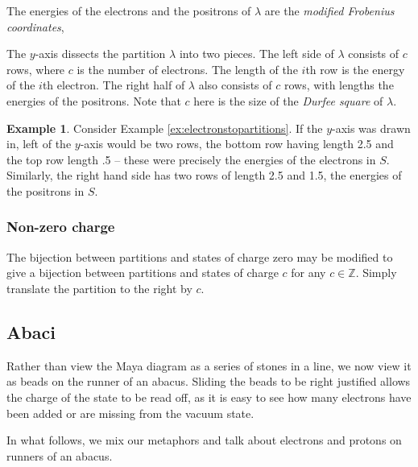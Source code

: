 \documentclass{amsart}[12pt]
\theoremstyle{definition}
\newtheorem{example}[dummy]{Example}
\newcommand{\Z}{\mathbb{Z}}
\begin{document}
The energies of the electrons and the positrons of $\lambda$ are
the \emph{modified Frobenius coordinates},

The $y$-axis dissects the partition $\lambda$ into two pieces.  The left side of $\lambda$ consists of $c$ rows, where $c$ is the number
of electrons.  The length of the $i$th row is the energy of
the $i$th electron.  The right half of $\lambda$ also consists of $c$ rows, with lengths the energies of the positrons.  Note that $c$ here is the size of the \emph{Durfee square} of $\lambda$.



\begin{example} Consider Example \ref{ex:electronstopartitions}.  If the $y$-axis was drawn in, left of the $y$-axis would be two rows, the bottom row having length 2.5 and the top row length .5 -- these were precisely the energies of the electrons in $S$.  Similarly, the right hand side has two rows of length 2.5 and 1.5, the energies of the positrons in $S$.


\end{example}

\subsubsection{Non-zero charge}

The bijection between partitions and states of charge zero may be
modified to give a bijection between partitions and states of charge $c$ for any $c\in\Z$.   Simply translate the partition to the right by $c$.



\subsection{Abaci}

Rather than view the Maya diagram as a series of stones in a line, we
now view it as beads on the runner of an abacus.  Sliding the beads
to be right justified allows the charge of the state to be read off,
as it is easy to see how many electrons have been added or are missing
from the vacuum state.

In what follows, we mix our metaphors and talk about electrons and protons on runners of an abacus.
\end{document}
